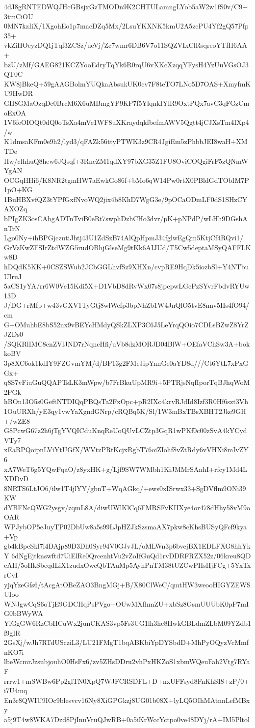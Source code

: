 4dJ8gRNTEDWQJHcGBsjxGzTMODn9K2CHTULamngLYob5aW2w1fS0v/C9+3tmCiOU
0MN7kzIiX/1XgohEo1p7macDZq5Mx/2LsuYKXNK5kmU2A5zcPU4Yf2gQ57Pfp35+
vkZiHOcyzDQ1jTqf3ZCSz/ueVj/Zc7wmr6DB6V7o11SQZVIxClRsqreoYTfH6AA+
bzU/zMf/GAEG821KCZYooEdryTqYk6R0rqU6vXKcXzqqYFysH4YzUuVGsOJ3QT0C
KW8jBkeQ+59gAAGBolmYUQkaAbsukUK0cv7F8teTO7LNo5D7OAS+XmyfmKU9HwDR
GH8GMaOzqDe0BrcM6X6uMBmgYP9KP7f5YlqnkIYlR9OxtPQx7avC3qFGzCmoExOA
1V6feOIOQt0dQ0oTsXa4mVe1WF8uXKraydqkfbefmAWV5Qgtt4jCJXsTm4IXp4/w
K1dmsaKFm0e9h2/lyd3/qFAZk56ttyPTWK3z9CR4JgiEm5zPhbbJEI8waH+XMTDe
Hw/clhhuQ8hew6JQsqf+3RneZM1qdXY97bXG35Z1FU8OviCOQgiFrF5zQNmWYgAN
OCGqHHi6/K8NR2tgmHW7aEwkGo86f+bMo6qW14Pw0rtX0PBldGdTObIM7P1pO+KG
1BuHBXvfQZ3tYPfGxfNvoWQ2jix4b8KhD7WgG3e/9pOCaODmLF0dS1SHzCYAXOZq
bPIgZK3osCAbgADTnTviB0eRt7swphDzhCHo3dvr/pK+pNPdP/wLHh9DGshAnTrN
Lgo0Ny+ihBPGjczutiJhtj43U1ZdSzB74AlQpHpmJ34fglwEgQm5KtjCf4RQvi1/
GrVzKwZFSIrZtdWZG5rudOBhjGlseMg9tKk6AIJUd/T5Cw5deptaMSyQAFFLKw8D
hDQdK5KK+0CSZSWub2JCbGGLhvfSz9XHXn/cvpRE9HqDk5iozbSl+Y4NTbuUIruJ
5aCS1yYA/rr6W0Ve15Kdi5X+D1VbD8dRvWx07s8jpepwLGcPzSYvrFbdvRYUw13D
J/DG+rMfp+w43vGXV1TyGtj8wlWefp3bpNhZb1W4JnQlO5tvE8nnv5Hs4fO94/cm
G+OMuhbE8bS52nx9vBEYcHMdyQSkZLXP3C6J5LeYrqQOio7CDLsBZwZ8YrZJZDs0
/SQKRlIMC8enZVlJND7rNqncHfi/uVb8dzMORJD04BlW+OEfaVChSw3A+bokkoBV
3p8XC6ok1kdIY9FZGvmYM/d/BP13g2FMeJipYnnGe0aYD8d///Ct6YtL7xPxGGx+
q8S7vFiuGuQQAPTsLK3mWpw/b7FrBkuUpMR9i+5PTRjsNqfIporTqBJhqWoM2PGk
hBOn13O5s0GeftNTDIQqPBQsTa2FxOpc+pR2IXo4krvRJdId8Izf3R0Hf6szt3Vh
1OuURXh/yE3qy1vwYaXgndGNrp/cRQBq5K/Sl/1W3mBxTBsXBHT2Jke9GH+/wZE8
G8PcwG67z2h6jTgYVQICduKnqReUoQUvLCZtp3GqR1wPKf0c00zSvA4kYCydVTy7
xEaRPQoipnLViYtUGfX/WVtzPRtKcjxRgbT76oiZIohf8vZtRdy6vVHXi8mIvZY6
xA7WeT6g5YQwFqaO/z8yxHK+g/Ljf9SW7WMbh1KiJMMrSAnhI+rfcy1Md4LXDDvD
8NRTS6LtJO6/ilw1T4jlYY/gbnT+WqAGkq/+ews0xISrwx33+SgDVflm9ONi39KW
dYBFNcQWG2ysgv/zqmL8A/diwUWlKlCq6FMRSFvKIIXye4or478dHhy58vM9oOAR
WPJybOP5eJuyTP02DbUw8a5s99LJpHZJkSzsmaAX7pkw8cKhsBUSyQFcf9kya+Vp
gb4kBpeSkl7l4DAjp89D3Dh0Syr94V0GJvJL/oMLWn3p6bvcjBX1EDLFXG8hhYkY
6dNgEjtknswftd7UiElRe0QrcenhtVu2vZoIfGuQd1rvDDRFRZX52z/06kreu8QD
cAH/5oHkSbeqdLiX1zudxOwcQbTAuMp5AyhPnTM38tUZCwPHsHjFCg+5YxTxrCvI
yjqYzeGfs6/tAcgAtOBeZAO3BngMGj+B/X80ClWeC/qmtHW3weooHIGYZEWSUIoo
WNJgwCqS6oTjE9GDCHqPsPVgo+OUwMXfhmZU+xbSz8GsmUUUbK0pP7mIG0bBWyWA
YiGgGW6RzCbHCuWx2junCKAS3vp5Fs3UG1lh3hc8HwkGBLdmZLbM09YZdb1f9gIR
2GsXj/wJh7RTdUScziL3/LU21FMgT1bqABKbiYpDYSbdD+MhPyOQyzVcMmfnKO7i
lbeWcmrJzsubjouhO0HsFx6/zv5ZHsDDru2vhPxHKZoS1xbmWQeuFah2Vtg7RYaF
rrrw1+mSWBw6Pp2glTN0XpQ7WJFCRSDFL+D+nxUFFsyd8FnKhSI8+zP/0+i7U4mq
En3r8QWIU9IOc9blesvcv16Ny8XiGPGkzj8UG01b08X+lyLQ5OIhMAtnnLefMBxy
a5j9T4w8WKA7Dzd8PjInuVruQJwRB+0a5iKrWccYctpo0ve48DYj/rA+IM5Pltol
